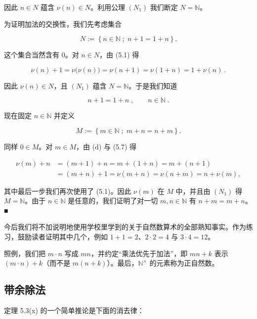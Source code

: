 \begin{theorem}
\begin{items}
因此 $ n \in N $ 蕴含 $ \nu(n) \in N $。利用公理 $ (N_{1}) $ 我们断定 $ N = \mathbb{N} $。

\item

为证明加法的交换性，我们先考虑集合

\begin{equation}
N:=\left\{n\in\mathbb{N}\;;\;n+1=1+n\right\}.
\end{equation}

这个集合当然含有 0。对 $ n \in N $，由 (5.1) 得

\[
\nu(n)+1=\nu\bigl(\nu(n)\bigr)=\nu(n+1)=\nu(1+n)=1+\nu(n)~.
\]

因此 $ \nu(n) \in N $，且 $ (N_1) $ 蕴含 $ N = \mathbb{N} $。于是我们知道

\[
n+1=1+n\;,\qquad n\in\mathbb{N}\;.
\]

现在固定 $ n \in \mathbb{N} $ 并定义

\[
M:=\left\{m\in\mathbb{N}\;;\;m+n=n+m\right\}.
\]

同样 $ 0 \in M $。对 $ m \in M $，由 (d) 与 (5.7) 得

\begin{equation*}
\begin{aligned}
\nu(m)+n&=(m+1)+n=m+(1+n)=m+(n+1)\\&=(m+n)+1=\nu(m+n)=\nu(n+m)=n+\nu(m),
\end{aligned}
\end{equation*}

其中最后一步我们再次使用了 (5.1)。因此 $ \nu(m) $ 在 $ M $ 中，并且由 $ (N_1) $ 得 $ M = \mathbb{N} $。由于 $ n \in \mathbb{N} $ 是任意的，我们证明了对一切 $ m, n \in \mathbb{N} $ 有 $ n + m = m + n $。■

\end{items}

\end{theorem}

今后我们将不加说明地使用学校里学到的关于自然数算术的全部熟知事实。作为练习，鼓励读者证明其中几个，例如 $ 1+1=2 $、$ 2\cdot2=4 $ 与 $ 3\cdot4=12 $。

照例，我们把 $m \cdot n$ 写成 $mn$，并约定“乘法优先于加法”，即 $mn + k$ 表示 $(m \cdot n) + k$（而不是 $m(n + k)$）。最后，$\mathbb{N}^{\times}$ 的元素称为正自然数。

\subsection*{带余除法}

定理 5.3(x) 的一个简单推论是下面的消去律：

